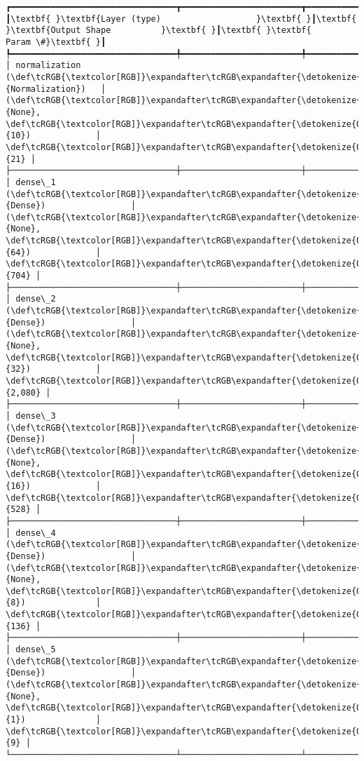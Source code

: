 \documentclass[11pt]{article}
\begin{document}
    \begin{Verbatim}[commandchars=\\\{\}]
┏━━━━━━━━━━━━━━━━━━━━━━━━━━━━━━━━━┳━━━━━━━━━━━━━━━━━━━━━━━━┳━━━━━━━━━━━━━━━┓
┃\textbf{ }\textbf{Layer (type)                   }\textbf{ }┃\textbf{ }\textbf{Output Shape          }\textbf{ }┃\textbf{ }\textbf{      Param \#}\textbf{ }┃
┡━━━━━━━━━━━━━━━━━━━━━━━━━━━━━━━━━╇━━━━━━━━━━━━━━━━━━━━━━━━╇━━━━━━━━━━━━━━━┩
│ normalization (\def\tcRGB{\textcolor[RGB]}\expandafter\tcRGB\expandafter{\detokenize{0,135,255}}{Normalization})   │ (\def\tcRGB{\textcolor[RGB]}\expandafter\tcRGB\expandafter{\detokenize{0,215,255}}{None}, \def\tcRGB{\textcolor[RGB]}\expandafter\tcRGB\expandafter{\detokenize{0,175,0}}{10})             │            \def\tcRGB{\textcolor[RGB]}\expandafter\tcRGB\expandafter{\detokenize{0,175,0}}{21} │
├─────────────────────────────────┼────────────────────────┼───────────────┤
│ dense\_1 (\def\tcRGB{\textcolor[RGB]}\expandafter\tcRGB\expandafter{\detokenize{0,135,255}}{Dense})                 │ (\def\tcRGB{\textcolor[RGB]}\expandafter\tcRGB\expandafter{\detokenize{0,215,255}}{None}, \def\tcRGB{\textcolor[RGB]}\expandafter\tcRGB\expandafter{\detokenize{0,175,0}}{64})             │           \def\tcRGB{\textcolor[RGB]}\expandafter\tcRGB\expandafter{\detokenize{0,175,0}}{704} │
├─────────────────────────────────┼────────────────────────┼───────────────┤
│ dense\_2 (\def\tcRGB{\textcolor[RGB]}\expandafter\tcRGB\expandafter{\detokenize{0,135,255}}{Dense})                 │ (\def\tcRGB{\textcolor[RGB]}\expandafter\tcRGB\expandafter{\detokenize{0,215,255}}{None}, \def\tcRGB{\textcolor[RGB]}\expandafter\tcRGB\expandafter{\detokenize{0,175,0}}{32})             │         \def\tcRGB{\textcolor[RGB]}\expandafter\tcRGB\expandafter{\detokenize{0,175,0}}{2,080} │
├─────────────────────────────────┼────────────────────────┼───────────────┤
│ dense\_3 (\def\tcRGB{\textcolor[RGB]}\expandafter\tcRGB\expandafter{\detokenize{0,135,255}}{Dense})                 │ (\def\tcRGB{\textcolor[RGB]}\expandafter\tcRGB\expandafter{\detokenize{0,215,255}}{None}, \def\tcRGB{\textcolor[RGB]}\expandafter\tcRGB\expandafter{\detokenize{0,175,0}}{16})             │           \def\tcRGB{\textcolor[RGB]}\expandafter\tcRGB\expandafter{\detokenize{0,175,0}}{528} │
├─────────────────────────────────┼────────────────────────┼───────────────┤
│ dense\_4 (\def\tcRGB{\textcolor[RGB]}\expandafter\tcRGB\expandafter{\detokenize{0,135,255}}{Dense})                 │ (\def\tcRGB{\textcolor[RGB]}\expandafter\tcRGB\expandafter{\detokenize{0,215,255}}{None}, \def\tcRGB{\textcolor[RGB]}\expandafter\tcRGB\expandafter{\detokenize{0,175,0}}{8})              │           \def\tcRGB{\textcolor[RGB]}\expandafter\tcRGB\expandafter{\detokenize{0,175,0}}{136} │
├─────────────────────────────────┼────────────────────────┼───────────────┤
│ dense\_5 (\def\tcRGB{\textcolor[RGB]}\expandafter\tcRGB\expandafter{\detokenize{0,135,255}}{Dense})                 │ (\def\tcRGB{\textcolor[RGB]}\expandafter\tcRGB\expandafter{\detokenize{0,215,255}}{None}, \def\tcRGB{\textcolor[RGB]}\expandafter\tcRGB\expandafter{\detokenize{0,175,0}}{1})              │             \def\tcRGB{\textcolor[RGB]}\expandafter\tcRGB\expandafter{\detokenize{0,175,0}}{9} │
└─────────────────────────────────┴────────────────────────┴───────────────┘


\end{Verbatim}
\end{document}

